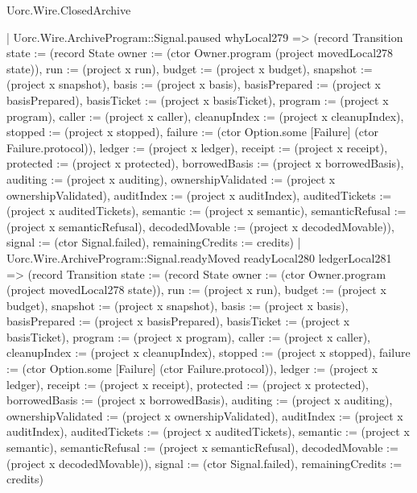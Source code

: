 \begin{lexlean}{Uorc.Wire.ClosedArchive}
\begin{semanticmodule}
{        | Uorc.Wire.ArchiveProgram::Signal.paused whyLocal279 => (record Transition {state := (record State {owner := (ctor Owner.program (project movedLocal278 state)), run := (project x run), budget := (project x budget), snapshot := (project x snapshot), basis := (project x basis), basisPrepared := (project x basisPrepared), basisTicket := (project x basisTicket), program := (project x program), caller := (project x caller), cleanupIndex := (project x cleanupIndex), stopped := (project x stopped), failure := (ctor Option.some [Failure] (ctor Failure.protocol)), ledger := (project x ledger), receipt := (project x receipt), protected := (project x protected), borrowedBasis := (project x borrowedBasis), auditing := (project x auditing), ownershipValidated := (project x ownershipValidated), auditIndex := (project x auditIndex), auditedTickets := (project x auditedTickets), semantic := (project x semantic), semanticRefusal := (project x semanticRefusal), decodedMovable := (project x decodedMovable)}), signal := (ctor Signal.failed), remainingCredits := credits})
        | Uorc.Wire.ArchiveProgram::Signal.readyMoved readyLocal280 ledgerLocal281 => (record Transition {state := (record State {owner := (ctor Owner.program (project movedLocal278 state)), run := (project x run), budget := (project x budget), snapshot := (project x snapshot), basis := (project x basis), basisPrepared := (project x basisPrepared), basisTicket := (project x basisTicket), program := (project x program), caller := (project x caller), cleanupIndex := (project x cleanupIndex), stopped := (project x stopped), failure := (ctor Option.some [Failure] (ctor Failure.protocol)), ledger := (project x ledger), receipt := (project x receipt), protected := (project x protected), borrowedBasis := (project x borrowedBasis), auditing := (project x auditing), ownershipValidated := (project x ownershipValidated), auditIndex := (project x auditIndex), auditedTickets := (project x auditedTickets), semantic := (project x semantic), semanticRefusal := (project x semanticRefusal), decodedMovable := (project x decodedMovable)}), signal := (ctor Signal.failed), remainingCredits := credits})
}
\end{semanticmodule}
\end{lexlean}
